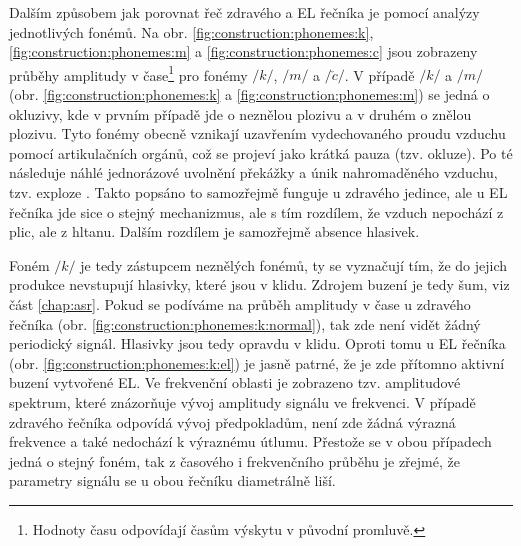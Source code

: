 Dalším způsobem jak porovnat řeč zdravého a EL řečníka je pomocí analýzy jednotlivých fonémů. Na obr. \ref{fig:construction:phonemes:k}, \ref{fig:construction:phonemes:m} a \ref{fig:construction:phonemes:c} jsou zobrazeny průběhy amplitudy v čase\footnote{Hodnoty času odpovídají časům výskytu v původní promluvě.} pro fonémy $/k/$, $/m/$ a $/\check{c}/$. V případě $/k/$ a $/m/$ (obr. \ref{fig:construction:phonemes:k} a \ref{fig:construction:phonemes:m}) se jedná o okluzivy, kde v prvním případě jde o neznělou plozivu a v druhém o znělou plozivu. Tyto fonémy obecně vznikají uzavřením vydechovaného proudu vzduchu pomocí artikulačních orgánů, což se projeví jako krátká pauza (tzv. okluze). Po té následuje náhlé jednorázové uvolnění překážky a únik nahromaděného vzduchu, tzv. exploze \cite{Psutka2006}. Takto popsáno to samozřejmě funguje u zdravého jedince, ale u EL řečníka jde sice o stejný mechanizmus, ale s tím rozdílem, že vzduch nepochází z plic, ale z hltanu. Dalším rozdílem je samozřejmě absence hlasivek.

Foném $/k/$ je tedy zástupcem neznělých fonémů, ty se vyznačují tím, že do jejich produkce nevstupují hlasivky, které jsou v klidu. Zdrojem buzení je tedy šum, viz část \ref{chap:asr}. Pokud se podíváme na průběh amplitudy v čase u zdravého řečníka (obr. \ref{fig:construction:phonemes:k:normal}), tak zde není vidět žádný periodický signál. Hlasivky jsou tedy opravdu v klidu. Oproti tomu u EL řečníka (obr. \ref{fig:construction:phonemes:k:el}) je jasně patrné, že je zde přítomno aktivní buzení vytvořené EL. Ve frekvenční oblasti je zobrazeno tzv. amplitudové spektrum, které znázorňuje vývoj amplitudy signálu ve frekvenci. V případě zdravého řečníka odpovídá vývoj předpokladům, není zde žádná výrazná frekvence a také nedochází k výraznému útlumu. Přestože se v obou případech jedná o stejný foném, tak z časového i frekvenčního průběhu je zřejmé, že parametry signálu se u obou řečníku diametrálně liší.

